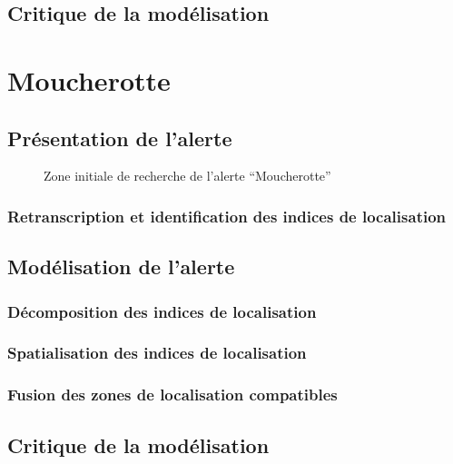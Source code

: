 \subsection{Critique de la modélisation}
\label{subsec:9-1-3}


\section{Moucherotte}
\label{sec:9-2}

\subsection{Présentation de l'alerte}
\label{subsec:9-2-1}


\begin{figure}
  \centering
  
  \caption{Zone initiale de recherche de l'alerte
    \enquote{Moucherotte}}
  \label{fig:zir_moucherotte}
\end{figure}

\subsubsection{Retranscription et identification des indices de localisation}
\label{subsec:9-2-1-1}

\subsection{Modélisation de l'alerte}
\label{subsec:9-2-2}

\subsubsection{Décomposition des indices de localisation}
\label{subsec:9-2-2-2}

\subsubsection{Spatialisation des indices de localisation}
\label{subsec:9-2-2-3}

\subsubsection{Fusion des zones de localisation compatibles}
\label{subsec:9-2-2-4}

\subsection{Critique de la modélisation}
\label{subsec:9-2-3}




